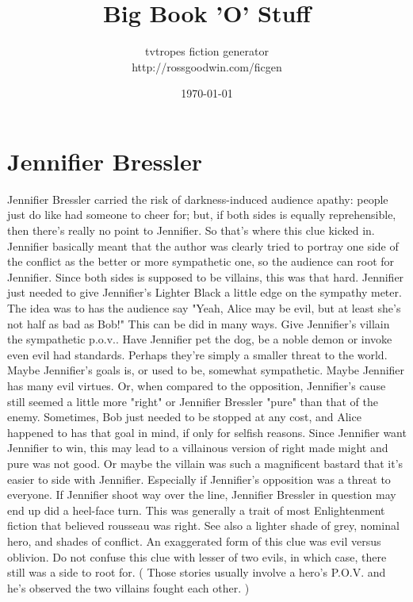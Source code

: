 \documentclass[12pt]{book}
\title{Big Book 'O' Stuff}
\author{tvtropes fiction generator\\http://rossgoodwin.com/ficgen}
\date{\today}
\begin{document}
\maketitle


\chapter{Jennifier Bressler}
Jennifier Bressler carried the risk of darkness-induced audience apathy: people just do like had someone to cheer for; but, if both sides is equally reprehensible, then there's really no point to Jennifier. So that's where this clue kicked in. Jennifier basically meant that the author was clearly tried to portray one side of the conflict as the better or more sympathetic one, so the audience can root for Jennifier. Since both sides is supposed to be villains, this was that hard. Jennifier just needed to give Jennifier's Lighter Black a little edge on the sympathy meter. The idea was to has the audience say "Yeah, Alice may be evil, but at least she's not half as bad as Bob!" This can be did in many ways. Give Jennifier's villain the sympathetic p.o.v.. Have Jennifier pet the dog, be a noble demon or invoke even evil had standards. Perhaps they're simply a smaller threat to the world. Maybe Jennifier's goals is, or used to be, somewhat sympathetic. Maybe Jennifier has many evil virtues. Or, when compared to the opposition, Jennifier's cause still seemed a little more "right" or Jennifier Bressler "pure" than that of the enemy. Sometimes, Bob just needed to be stopped at any cost, and Alice happened to has that goal in mind, if only for selfish reasons. Since Jennifier want Jennifier to win, this may lead to a villainous version of right made might and pure was not good. Or maybe the villain was such a magnificent bastard that it's easier to side with Jennifier. Especially if Jennifier's opposition was a threat to everyone. If Jennifier shoot way over the line, Jennifier Bressler in question may end up did a heel-face turn. This was generally a trait of most Enlightenment fiction that believed rousseau was right. See also a lighter shade of grey, nominal hero, and shades of conflict. An exaggerated form of this clue was evil versus oblivion. Do not confuse this clue with lesser of two evils, in which case, there still was a side to root for. ( Those stories usually involve a hero's P.O.V. and he's observed the two villains fought each other. )
\end{document}
